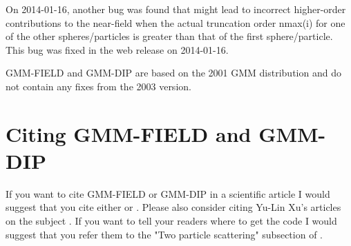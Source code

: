 On 2014-01-16, another bug was found that might lead to incorrect higher-order
contributions to the near-field when the actual truncation order nmax(i) for one
of the other spheres/particles is greater than that of the first sphere/particle.
This bug was fixed in the web release on 2014-01-16.

GMM-FIELD and GMM-DIP are based on the 2001 GMM distribution and do
not contain any fixes from the 2003 version.

\section{Citing GMM-FIELD and GMM-DIP}
If you want to cite GMM-FIELD or GMM-DIP in a scientific article I would suggest
that you cite either \cite{phdrin08} or \cite{rin08}. Please also consider citing
Yu-Lin Xu's articles on the subject \cite{xuy95, xuy95err, xuy97, xuy98}. If you
want to tell your readers where to get the code I would suggest that you refer
them to the "Two particle scattering" subsection of \cite{wwwwriedt}.



%

